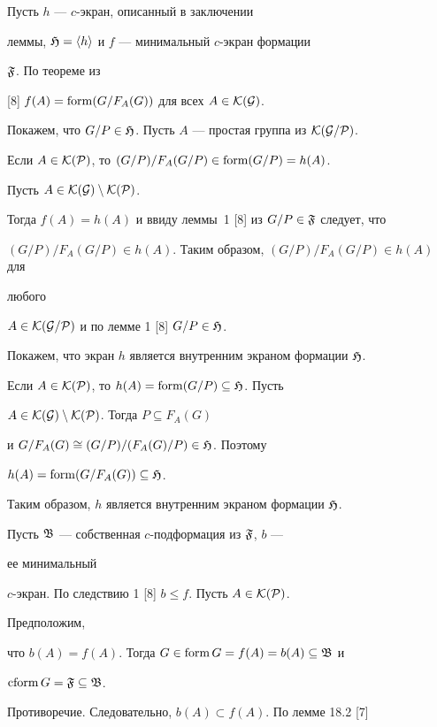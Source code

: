 \begin{pf} 


Пусть $h$ --- $c$-экран, описанный в заключении 


леммы, $\frak H=\langle h\rangle$ и $f$ --- минимальный $c$-экран формации 


$\frak F$. По теореме из 


[8] $f(A)=\operatorname{form}(G/F_A(G))$ для всех $A\in\cal K(G)$. 


 


Покажем, что $G/P\in\frak H$. Пусть $A$ --- простая группа из $\cal 


K(G/P)$. 


Если $A\in\cal K(P)$, то $(G/P)/F_A(G/P)\in\operatorname{form} (G/P)=h(A)$. 


Пусть $A\in\cal K(G)\setminus K(P)$. 


Тогда $f(A)=h(A)$ и ввиду леммы~1 [8] из $G/P\in\frak F$ следует, что 


$(G/P)/F_A(G/P)\in h(A)$. Таким образом, $(G/P)/F_A(G/P)\in h(A)$ для 


любого 


$A\in\cal K(G/P)$ и по лемме 1 [8] $G/P\in\frak H$. 


 


Покажем, что экран $h$ является внутренним экраном формации $\frak H$. 


Если $A\in\cal K(P)$, то $h(A)=\operatorname{form}(G/P)\subseteq\frak H$. Пусть 


$A\in\cal K(G)\setminus\cal K(P)$. Тогда $P\subseteq F_A(G)$ 


и $G/F_A(G)\cong (G/P)/(F_A(G)/P)\in\frak H$. Поэтому 


$h(A)=\operatorname{form}(G/F_A(G))\subseteq\frak H$. 


Таким образом, $h$ является внутренним экраном формации $\frak H$. 


 


Пусть $\frak B$ --- собственная $c$-подформация из $\frak F$, $b$ --- 


ее минимальный 


$c$-экран. По следствию 1 [8] $b\le f$. Пусть $A\in\cal K(P)$. 


Предположим, 


что $b(A)=f(A)$. Тогда $G\in\operatorname{form} G=f(A)=b(A)\subseteq\frak B$ и 


$\operatorname{cform} G=\frak F\subseteq\frak B$. 


Противоречие. Следовательно, $b(A)\subset f(A)$. По лемме 18.2 [7] 



\end{pf}
